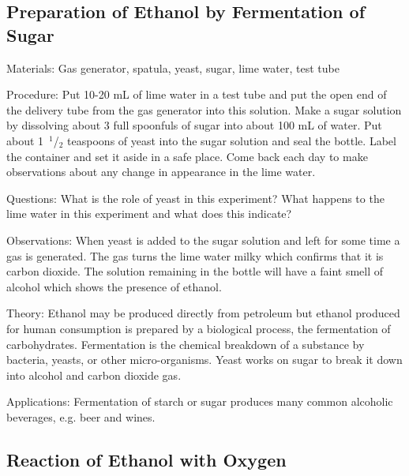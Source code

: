 \begin{multicols}{2}
\subsection{Preparation of Ethanol by Fermentation of Sugar}


\begin{description*}
\item[Materials:]{Gas generator, spatula, yeast, sugar, lime water, test tube}
\item[Procedure:]{Put 10-20 mL of lime water in a test tube and put the open end of the delivery tube from the gas generator into this solution. Make a sugar solution by dissolving about 3 full spoonfuls of sugar into about 100 mL of water. Put about 1~$^1$/$_2$ teaspoons of yeast into the sugar solution and seal the bottle. Label the container and set it aside in a safe place. Come back each day to make observations about any change in appearance in the lime water.}
\item[Questions:]{What is the role of yeast in this experiment? What happens to the lime water in this experiment and what does this indicate?}
\item[Observations:]{When yeast is added to the sugar solution and left for some time a gas is generated. The gas turns the lime water milky which confirms that it is carbon dioxide. The solution remaining in the bottle will have a faint smell of alcohol which shows the presence of ethanol.}
\item[Theory:]{Ethanol may be produced directly from petroleum but ethanol produced for human consumption is prepared by a biological process, the fermentation of carbohydrates. Fermentation is the chemical breakdown of a substance by bacteria, yeasts, or other micro-organisms. Yeast works on sugar to break it down into alcohol and carbon dioxide gas.}
\item[Applications:]{Fermentation of starch or sugar produces many common alcoholic beverages, e.g. beer and wines.}
\end{description*}

\subsection{Reaction of Ethanol with Oxygen}


\end{multicols}
